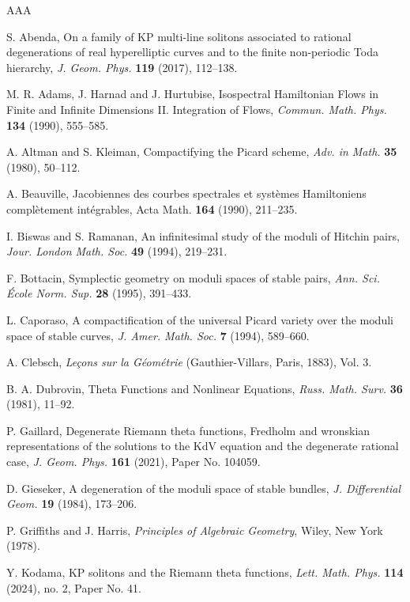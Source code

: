 \documentclass[12pt,reqno]{amsart}
\numberwithin{equation}{section}
\theoremstyle{definition}
\theoremstyle{remark}
\begin{document}
\begin{thebibliography}{AAA}

 S. Abenda, On a family of KP multi-line solitons associated to rational degenerations of real
hyperelliptic curves and to the finite non-periodic Toda hierarchy, {\it J. Geom. Phys.} {\bf 119} (2017), 112--138.

  M. R. Adams, J.  Harnad and J. Hurtubise, Isospectral
Hamiltonian Flows in Finite and Infinite Dimensions II. Integration of Flows, 
 {\it Commun. Math.  Phys. } {\bf 134} (1990), 555--585.

 A. Altman and S. Kleiman, Compactifying the Picard scheme, {\it Adv. in Math.}
{\bf 35} (1980), 50--112. 

 A. Beauville,  Jacobiennes des courbes spectrales et syst\`emes
Hamiltoniens  compl\`etement int\'egrables, {Acta  Math.} {\bf 164} (1990),  211--235.
 
 I. Biswas and S. Ramanan, An infinitesimal study of the moduli of Hitchin pairs,
{\it Jour. London Math. Soc.} {\bf 49} (1994), 219--231.

 F. Bottacin, Symplectic geometry on moduli spaces of stable pairs,
{\it Ann. Sci. \'Ecole Norm. Sup.} {\bf 28} (1995), 391--433.

 L. Caporaso, A compactification of the universal Picard variety over the moduli
space of stable curves, {\it J. Amer. Math. Soc.} {\bf 7} (1994), 589--660.

 A. Clebsch, \textit{Le\c cons sur la G\'eom\'etrie} (Gauthier-Villars, Paris, 1883), Vol.
3.

 B. A. Dubrovin, Theta Functions and Nonlinear Equations,
{\it Russ. Math. Surv.} {\bf 36} (1981), 11--92.

 P. Gaillard, Degenerate Riemann theta functions, Fredholm and wronskian representations of the
solutions to the KdV equation and the degenerate rational case, {\it J. Geom. Phys.} {\bf 161} (2021), Paper No. 104059.

 D. Gieseker, A degeneration of the moduli space of stable bundles, {\it J. Differential Geom.}
{\bf 19} (1984), 173--206.

 P. Griffiths and J. Harris, {\it Principles of Algebraic
Geometry},  Wiley, New York (1978).

 Y. Kodama, KP solitons and the Riemann theta functions,
{\it Lett. Math. Phys.} {\bf 114} (2024), no. 2, Paper No. 41.


\end{thebibliography}
\end{document}
